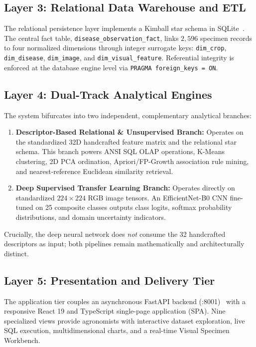 \documentclass[conference]{IEEEtran}
\begin{document}
\subsection{Layer 3: Relational Data Warehouse and ETL}
The relational persistence layer implements a Kimball star schema in SQLite~\cite{kimball2013datawarehouse}. The central fact table, \texttt{disease\_observation\_fact}, links $2,596$ specimen records to four normalized dimensions through integer surrogate keys: \texttt{dim\_crop}, \texttt{dim\_disease}, \texttt{dim\_image}, and \texttt{dim\_visual\_feature}. Referential integrity is enforced at the database engine level via \texttt{PRAGMA foreign\_keys = ON}.

\subsection{Layer 4: Dual-Track Analytical Engines}
The system bifurcates into two independent, complementary analytical branches:
\begin{enumerate}
    \item \textbf{Descriptor-Based Relational \& Unsupervised Branch:} Operates on the standardized 32D handcrafted feature matrix and the relational star schema. This branch powers ANSI SQL OLAP operations, K-Means clustering, 2D PCA ordination, Apriori/FP-Growth association rule mining, and nearest-reference Euclidean similarity retrieval.
    \item \textbf{Deep Supervised Transfer Learning Branch:} Operates directly on standardized $224\times 224$ RGB image tensors. An EfficientNet-B0 CNN fine-tuned on 25 composite classes outputs class logits, softmax probability distributions, and domain uncertainty indicators.
\end{enumerate}
Crucially, the deep neural network does \textit{not} consume the 32 handcrafted descriptors as input; both pipelines remain mathematically and architecturally distinct.

\subsection{Layer 5: Presentation and Delivery Tier}
The application tier couples an asynchronous FastAPI backend (:8001)~\cite{ramirez2018fastapi} with a responsive React 19 and TypeScript single-page application (SPA). Nine specialized views provide agronomists with interactive dataset exploration, live SQL execution, multidimensional charts, and a real-time Visual Specimen Workbench.
\end{document}
